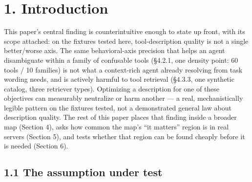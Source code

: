 \hypertarget{introduction}{%
\section{1. Introduction}\label{introduction}}

This paper's central finding is counterintuitive enough to state up
front, with its scope attached: on the fixtures tested here,
tool-description quality is not a single better/worse axis. The same
behavioral-axis precision that helps an agent disambiguate within a
family of confusable tools (§4.2.1, one density point: 60 tools / 10
families) is not what a context-rich agent already resolving from task
wording needs, and is actively harmful to tool retrieval (§4.3.3, one
synthetic catalog, three retriever types). Optimizing a description for
one of these objectives can measurably neutralize or harm another --- a
real, mechanistically legible pattern on the fixtures tested, not a
demonstrated general law about description quality. The rest of this
paper places that finding inside a broader map (Section 4), asks how
common the map's ``it matters'' region is in real servers (Section 5),
and tests whether that region can be found cheaply before it is needed
(Section 6).

\hypertarget{the-assumption-under-test}{%
\subsection{1.1 The assumption under
test}\label{the-assumption-under-test}}

